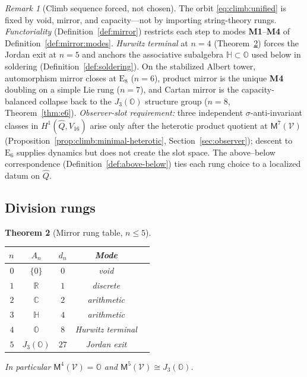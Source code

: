 \documentclass[aps,prd,onecolumn,amsmath,amssymb,nofootinbib,11pt]{revtex4-2}
\numberwithin{equation}{section}
\theoremstyle{plain}
\newtheorem{theorem}{Theorem}[section]
\theoremstyle{definition}
\theoremstyle{remark}
\newtheorem{remark}[theorem]{Remark}
\newcommand{\R}{\mathbb{R}}
\newcommand{\C}{\mathbb{C}}
\newcommand{\Quat}{\mathbb{H}}
\newcommand{\Oct}{\mathbb{O}}
\newcommand{\jalg}{J_3(\mathbb{O})}
\newcommand{\E}[1]{\mathrm{E}_{#1}}
\newcommand{\Void}{\mathcal{V}}
\newcommand{\Mirror}{\mathsf{M}}
\begin{document}
\begin{remark}[Climb sequence forced, not chosen]\label{rem:climb:forced}
The orbit \eqref{eq:climb:unified} is fixed by void, mirror, and capacity---not
by importing string-theory rungs. \emph{Functoriality}
(Definition~\ref{def:mirror}) restricts each step to modes
\textbf{M1}--\textbf{M4} of Definition~\ref{def:mirror:modes}. \emph{Hurwitz
terminal} at $n=4$ (Theorem~\ref{thm:rung-table}) forces the Jordan exit at
$n=5$ and anchors the associative subalgebra $\Quat\subset\Oct$ used below in
soldering (Definition~\ref{def:soldering}). On the stabilized Albert tower,
automorphism mirror closes at $\E{8}$ ($n=6$), product mirror is the unique
\textbf{M4} doubling on a simple Lie rung ($n=7$), and Cartan mirror is the
capacity-balanced collapse back to the $\jalg$ structure group ($n=8$,
Theorem~\ref{thm:e6}). \emph{Observer-slot requirement:} three independent
$\sigma$-anti-invariant classes in $H^1(\hat Q,V_{16})$ arise only after the
heterotic product quotient at $\Mirror^7(\Void)$ (Proposition~\ref{prop:climb:minimal-heterotic},
Section~\ref{sec:observer}); descent to $\E{6}$ supplies dynamics but does not
create the slot space. The above--below correspondence
(Definition~\ref{def:above-below}) ties each rung choice to a localized datum on
$\hat Q$.
\end{remark}

\subsection{Division rungs}
\label{sec:climb:division}

\begin{theorem}[Mirror rung table, $n\leq5$]\label{thm:rung-table}
\begin{center}
\renewcommand{\arraystretch}{1.15}
\begin{tabular}{@{}rcccc@{}}
\toprule
$n$ & $A_n$ & $d_n$ & Mode & \\
\midrule
$0$ & $\{0\}$ & $0$ & void & \\
$1$ & $\R$ & $1$ & discrete & \\
$2$ & $\C$ & $2$ & arithmetic & \\
$3$ & $\Quat$ & $4$ & arithmetic & \\
$4$ & $\Oct$ & $8$ & Hurwitz terminal & \\
$5$ & $\jalg$ & $27$ & Jordan exit & \\
\bottomrule
\end{tabular}
\end{center}
In particular $\Mirror^4(\Void)=\Oct$ and $\Mirror^5(\Void)\cong\jalg$.
\end{theorem}
\end{document}
